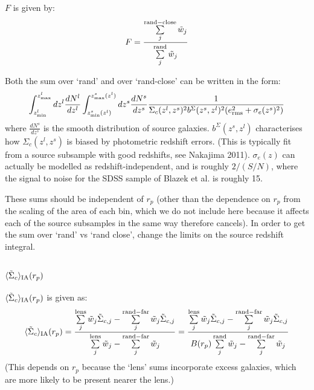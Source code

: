 \documentclass[onecolumn,amsmath,aps,fleqn, superscriptaddress]{revtex4}
\begin{document}
$F$ is given by:
\begin{equation}
F= \frac{\sum\limits_{j}^{\rm rand-close}\tilde{w}_j}{\sum\limits_{j}^{\rm rand} \tilde{w}_j} 
\label{F}
\end{equation}

Both the sum over `rand' and over `rand-close' can be written in the form:
\begin{equation}
\int_{z^l_{\rm min}}^{z^l_{\rm max}}dz^l \frac{dN^l}{dz^l} \int_{z^s_{\rm min}(z^l)}^{z^s_{\rm max}(z^l)}dz^s \frac{dN^s}{dz^s} \frac{1}{\Sigma_c(z^l , z^s)^2 b^{\Sigma}(z^s,z^l)^2 (e_{\rm rms}^2 + \sigma_e(z^s)^2)}
\label{randint_w}
\end{equation}
where $\frac{dN^s}{dz^s}$ is the smooth distribution of source galaxies. $b^{\Sigma}(z^s,z^l)$ characterises how $\Sigma_c(z^l , z^s)$ is biased by photometric redshift errors. (This is typically fit from a source subsample with good redshifts, see Nakajima 2011). $\sigma_e(z)$ can actually be modelled as redshift-independent, and is roughly $2 / (S/N)$, where the signal to noise for the SDSS sample of Blazek et al. is roughly 15. 

These sums should be independent of $r_p$ (other than the dependence on $r_p$ from the scaling of the area of each bin, which we do not include here because it affects each of the source subsamples in the same way therefore cancels). In order to get the sum over `rand' vs `rand close', change the limits on the source redshift integral. 

\subsection*{$\langle \tilde{\Sigma}_c\rangle_{\rm IA}(r_p)$}

$\langle \tilde{\Sigma}_c\rangle_{\rm IA}(r_p)$ is given as:
\begin{equation}
\langle \tilde{\Sigma}_c\rangle_{\rm IA} (r_p) = \frac{\sum\limits_{j}^{\rm lens} \tilde{w}_j \tilde{\Sigma}_{c,j}- \sum\limits_{j}^{\rm rand-far} \tilde{w}_j \tilde{\Sigma}_{c,j}}{\sum\limits_{j}^{\rm lens} \tilde{w}_j - \sum\limits_{j}^{\rm rand-far} \tilde{w}_j} = \frac{\sum\limits_{j}^{\rm lens} \tilde{w}_j \tilde{\Sigma}_{c,j}- \sum\limits_{j}^{\rm rand-far} \tilde{w}_j \tilde{\Sigma}_{c,j}}{B(r_p)\sum\limits_{j}^{\rm rand} \tilde{w}_j - \sum\limits_{j}^{\rm rand-far} \tilde{w}_j}
\label{SigmaIA}
\end{equation}
(This depends on $r_p$ because the `lens' sums incorporate excess galaxies, which are more likely to be present nearer the lens.)
\end{document}

